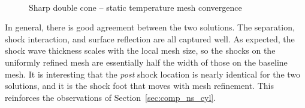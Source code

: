 \begin{figure}[hbtp]
  \begin{center}
     \\      
    \caption{Sharp double cone -- static temperature mesh convergence\label{fig:aedc_double_cone_2894_mesh_convergence_T}}
  \end{center}
\end{figure}
In general, there is good agreement between the two solutions. The separation, shock interaction, and surface reflection are all captured well. As expected, the shock wave thickness scales with the local mesh size, so the shocks on the uniformly refined mesh are essentially half the width of those on the baseline mesh.  It is interesting that the \emph{post} shock location is nearly identical for the two solutions, and it is the shock foot that moves with mesh refinement.  This reinforces the observations of Section~\ref{sec:comp_ns_cyl}.




